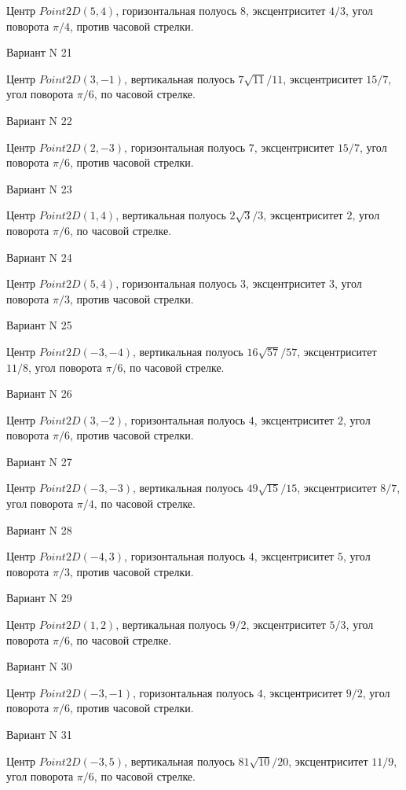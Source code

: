 \documentclass[11pt]{report}
\begin{document}
Центр $Point2D\left(5, 4\right)$, горизонтальная полуось $8$, эксцентриситет $4 / 3$, угол поворота $\pi / 4$, против часовой стрелки.

Вариант N 21

Центр $Point2D\left(3, -1\right)$, вертикальная полуось $7 \sqrt{11} / 11$, эксцентриситет $15 / 7$, угол поворота $\pi / 6$, по часовой стрелке.

Вариант N 22

Центр $Point2D\left(2, -3\right)$, горизонтальная полуось $7$, эксцентриситет $15 / 7$, угол поворота $\pi / 6$, против часовой стрелки.

Вариант N 23

Центр $Point2D\left(1, 4\right)$, вертикальная полуось $2 \sqrt{3} / 3$, эксцентриситет $2$, угол поворота $\pi / 6$, по часовой стрелке.

Вариант N 24

Центр $Point2D\left(5, 4\right)$, горизонтальная полуось $3$, эксцентриситет $3$, угол поворота $\pi / 3$, против часовой стрелки.

Вариант N 25

Центр $Point2D\left(-3, -4\right)$, вертикальная полуось $16 \sqrt{57} / 57$, эксцентриситет $11 / 8$, угол поворота $\pi / 6$, по часовой стрелке.

Вариант N 26

Центр $Point2D\left(3, -2\right)$, горизонтальная полуось $4$, эксцентриситет $2$, угол поворота $\pi / 6$, против часовой стрелки.

Вариант N 27

Центр $Point2D\left(-3, -3\right)$, вертикальная полуось $49 \sqrt{15} / 15$, эксцентриситет $8 / 7$, угол поворота $\pi / 4$, по часовой стрелке.

Вариант N 28

Центр $Point2D\left(-4, 3\right)$, горизонтальная полуось $4$, эксцентриситет $5$, угол поворота $\pi / 3$, против часовой стрелки.

Вариант N 29

Центр $Point2D\left(1, 2\right)$, вертикальная полуось $9 / 2$, эксцентриситет $5 / 3$, угол поворота $\pi / 6$, по часовой стрелке.

Вариант N 30

Центр $Point2D\left(-3, -1\right)$, горизонтальная полуось $4$, эксцентриситет $9 / 2$, угол поворота $\pi / 6$, против часовой стрелки.

Вариант N 31

Центр $Point2D\left(-3, 5\right)$, вертикальная полуось $81 \sqrt{10} / 20$, эксцентриситет $11 / 9$, угол поворота $\pi / 6$, по часовой стрелке.
\end{document}
